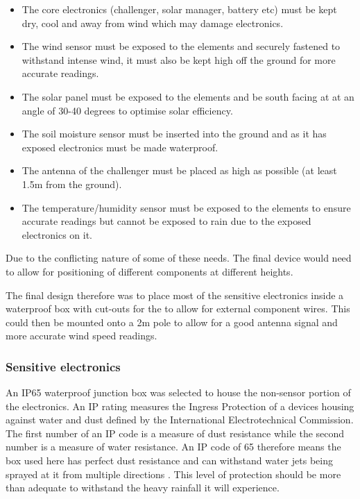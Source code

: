 \begin{itemize}
    \item The core electronics (challenger, solar manager, battery etc) must be
          kept dry, cool and away from wind which may damage electronics.
    \item The wind sensor must be exposed to the elements and securely fastened
          to withstand intense wind, it must also be kept high off the ground
          for more accurate readings.
    \item The solar panel must be exposed to the elements and be south facing at
          at an angle of 30-40 degrees to optimise solar efficiency.
    \item The soil moisture sensor must be inserted into the ground and as it
          has exposed electronics must be made waterproof.
    \item The antenna of the challenger must be placed as high as possible (at
          least 1.5m from the ground).
    \item The temperature/humidity sensor must be exposed to the elements to
          ensure accurate readings but cannot be exposed to rain due to the
          exposed electronics on it.
\end{itemize}

Due to the conflicting nature of some of these needs. The final device would
need to allow for positioning of different components at different heights.

The final design therefore was to place most of the sensitive electronics inside
a waterproof box with cut-outs for the to allow for external component wires.
This could then be mounted onto a 2m pole to allow for a good antenna signal and
more accurate wind speed readings.

\subsubsection{Sensitive electronics}

An IP65 waterproof junction box was selected to house the non-sensor portion of
the electronics. An IP rating measures the Ingress Protection of a devices
housing against water and dust defined by the International Electrotechnical
Commission. The first number of an IP code is a measure of dust resistance while
the second number is a measure of water resistance. An IP code of 65 therefore
means the box used here has perfect dust resistance and can withstand water jets
being sprayed at it from multiple directions \cite{wiki-ip}. This level of
protection should be more than adequate to withstand the heavy rainfall it will
experience.

